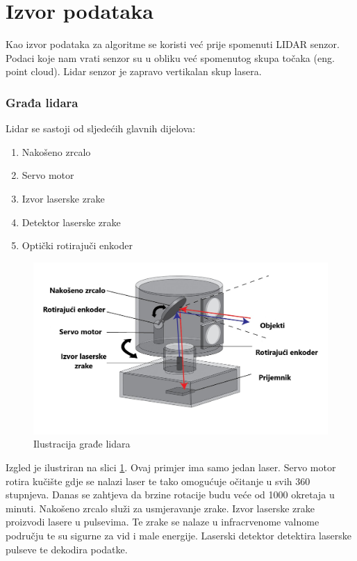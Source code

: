 \section{Izvor podataka}
Kao izvor podataka za algoritme se koristi već prije spomenuti LIDAR senzor. Podaci koje nam vrati senzor su u obliku već spomenutog skupa točaka (eng. point cloud). Lidar senzor je zapravo vertikalan skup lasera.

\subsubsection{Građa lidara}

Lidar se sastoji od sljedećih glavnih dijelova:
\begin{enumerate}
  \item Nakošeno zrcalo
  \item Servo motor
  \item Izvor laserske zrake
  \item Detektor laserske zrake
  \item Optički rotirajuči enkoder
\end{enumerate}


\begin{figure}[ht!]
  \centering
  \includegraphics[scale=0.4]{images/lidar_arch.jpg}
  \caption{Ilustracija građe lidara}
  \label{fig:lidar_arch}
\end{figure}


Izgled je ilustriran na slici \ref{fig:lidar_arch}. Ovaj primjer ima samo jedan laser. Servo motor rotira kučište gdje se nalazi laser te tako omogućuje očitanje u svih 360 stupnjeva. Danas se zahtjeva da brzine rotacije budu veće od 1000 okretaja u minuti. Nakošeno zrcalo služi za usmjeravanje zrake. Izvor laserske zrake proizvodi lasere u pulsevima. Te zrake se nalaze u infracrvenome valnome području te su sigurne za vid i male energije. Laserski detektor detektira laserske pulseve te dekodira podatke.

